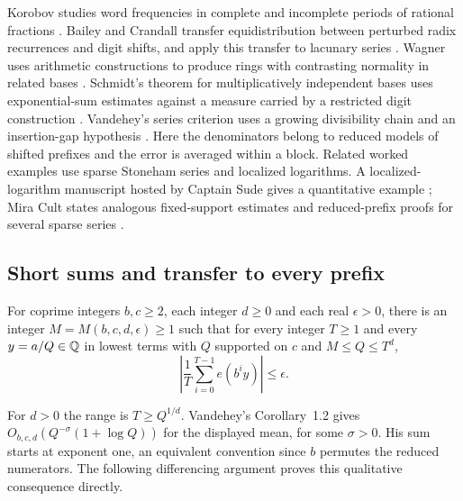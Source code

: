 \documentclass[11pt]{article}
\begin{document}
Korobov studies word frequencies in complete and incomplete periods of rational fractions \cite[pp.~659--660]{korobov}. Bailey and Crandall transfer equidistribution between perturbed radix recurrences and digit shifts, and apply this transfer to lacunary series \cite[Theorems~3.2 and 4.8]{bailey}. Wagner uses arithmetic constructions to produce rings with contrasting normality in related bases \cite[p.~211]{wagner}. Schmidt's theorem for multiplicatively independent bases uses exponential-sum estimates against a measure carried by a restricted digit construction \cite[Theorem~1]{schmidt}. Vandehey's series criterion uses a growing divisibility chain and an insertion-gap hypothesis \cite[Theorem~7.4, p.~24 of the preprint]{vandehey}. Here the denominators belong to reduced models of shifted prefixes and the error is averaged within a block. Related worked examples use sparse Stoneham series and localized logarithms. A localized-logarithm manuscript hosted by Captain Sude gives a quantitative example \cite[Theorems~1.1 and 4.1]{localized}; Mira Cult states analogous fixed-support estimates and reduced-prefix proofs for several sparse series \cite[Theorems~1--3]{mira}.

\subsection{Short sums and transfer to every prefix}
\begin{theorem}\label{thm:short}
For coprime integers \(b,c\ge2\), each integer \(d\ge0\) and each real \(\epsilon>0\), there is an integer \(M=M(b,c,d,\epsilon)\ge1\) such that for every integer \(T\ge1\) and every \(y=a/Q\in\mathbb Q\) in lowest terms with \(Q\) supported on \(c\) and \(M\le Q\le T^d\),
\[
 \left|\frac1T\sum_{i=0}^{T-1}e(b^iy)\right|\le\epsilon .
\]
\end{theorem}
For \(d>0\) the range is \(T\ge Q^{1/d}\). Vandehey's Corollary~1.2 \cite[p.~2 of the preprint]{vandehey} gives \(O_{b,c,d}(Q^{-\sigma}(1+\log Q))\) for the displayed mean, for some \(\sigma>0\). His sum starts at exponent one, an equivalent convention since \(b\) permutes the reduced numerators. The following differencing argument proves this qualitative consequence directly.
\end{document}
